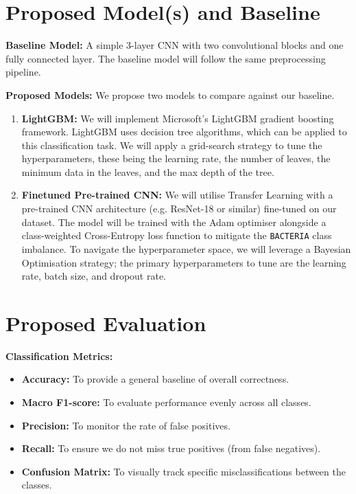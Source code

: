 \documentclass{article}
\begin{document}
\section{Proposed Model(s) and Baseline}

\textbf{Baseline Model:} A simple 3-layer CNN with two convolutional blocks and one fully connected layer. The baseline model will follow the same preprocessing pipeline.

\noindent \textbf{Proposed Models:} We propose two models to compare against our baseline.
\begin{enumerate}
    \item \textbf{LightGBM:} We will implement Microsoft's LightGBM \cite{10.5555/3294996.3295074} gradient boosting framework. LightGBM uses decision tree algorithms, which can be applied to this classification task. We will apply a grid-search strategy to tune the hyperparameters, these being the learning rate, the number of leaves, the minimum data in the leaves, and the max depth of the tree.
    \item \textbf{Finetuned Pre-trained CNN:} We will utilise Transfer Learning with a pre-trained CNN architecture (e.g. ResNet-18 or similar) fine-tuned on our dataset. The model will be trained with the Adam optimiser alongside a class-weighted Cross-Entropy loss function to mitigate the \texttt{BACTERIA} class imbalance. To navigate the hyperparameter space, we will leverage a Bayesian Optimisation strategy; the primary hyperparameters to tune are the learning rate, batch size, and dropout rate.
\end{enumerate}

\section{Proposed Evaluation}

\textbf{Classification Metrics:}
\begin{itemize}
    \item \textbf{Accuracy:} To provide a general baseline of overall correctness.
    \item \textbf{Macro F1-score:} To evaluate performance evenly across all classes.
    \item \textbf{Precision:} To monitor the rate of false positives.
    \item \textbf{Recall:} To ensure we do not miss true positives (from false negatives).
    \item \textbf{Confusion Matrix:} To visually track specific misclassifications between the classes.
\end{itemize}
\end{document}
